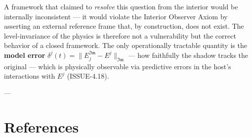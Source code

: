 \documentclass[11pt,a4paper]{article}
\theoremstyle{definition}
\theoremstyle{remark}
\begin{document}
A framework that claimed to \textit{resolve} this question from the interior would be internally inconsistent — it would violate the Interior Observer Axiom by asserting an external reference frame that, by construction, does not exist. The level-invariance of the physics is therefore not a vulnerability but the correct behavior of a closed framework. The only operationally tractable quantity is the \textbf{model error} $\delta^j(t) = \|E_j^{\mathfrak{Im}} - E^j\|_{\mathfrak{Im}}$ — how faithfully the shadow tracks the original — which is physically observable via predictive errors in the host's interactions with $E^j$ (ISSUE-4.18).

---

\section{References}
\end{document}
